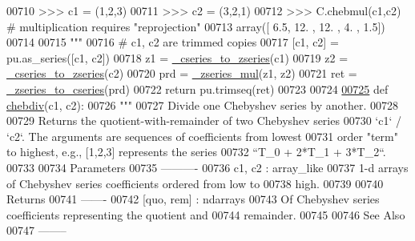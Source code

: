 \begin{DoxyCode}
00710 \textcolor{stringliteral}{    >>> c1 = (1,2,3)}
00711 \textcolor{stringliteral}{    >>> c2 = (3,2,1)}
00712 \textcolor{stringliteral}{    >>> C.chebmul(c1,c2) # multiplication requires "reprojection"}
00713 \textcolor{stringliteral}{    array([  6.5,  12. ,  12. ,   4. ,   1.5])}
00714 \textcolor{stringliteral}{}
00715 \textcolor{stringliteral}{    """}
00716     \textcolor{comment}{# c1, c2 are trimmed copies}
00717     [c1, c2] = pu.as\_series([c1, c2])
00718     z1 = \hyperlink{namespacepyneb_1_1utils_1_1chebyshev_a659e346f7cdd9fd058850b26f7e95b17}{\_cseries\_to\_zseries}(c1)
00719     z2 = \hyperlink{namespacepyneb_1_1utils_1_1chebyshev_a659e346f7cdd9fd058850b26f7e95b17}{\_cseries\_to\_zseries}(c2)
00720     prd = \hyperlink{namespacepyneb_1_1utils_1_1chebyshev_a46d958933482afac66ea41d143155dae}{\_zseries\_mul}(z1, z2)
00721     ret = \hyperlink{namespacepyneb_1_1utils_1_1chebyshev_a2a88474ce0ea12fb26f82b7116752dc1}{\_zseries\_to\_cseries}(prd)
00722     \textcolor{keywordflow}{return} pu.trimseq(ret)
00723 
00724 
\hypertarget{chebyshev_8py_source_l00725}{}\hyperlink{namespacepyneb_1_1utils_1_1chebyshev_aa84df28815f29342a7cdce9b95470f02}{00725} \textcolor{keyword}{def }\hyperlink{namespacepyneb_1_1utils_1_1chebyshev_aa84df28815f29342a7cdce9b95470f02}{chebdiv}(c1, c2):
00726     \textcolor{stringliteral}{"""}
00727 \textcolor{stringliteral}{    Divide one Chebyshev series by another.}
00728 \textcolor{stringliteral}{}
00729 \textcolor{stringliteral}{    Returns the quotient-with-remainder of two Chebyshev series}
00730 \textcolor{stringliteral}{    `c1` / `c2`.  The arguments are sequences of coefficients from lowest}
00731 \textcolor{stringliteral}{    order "term" to highest, e.g., [1,2,3] represents the series}
00732 \textcolor{stringliteral}{    ``T\_0 + 2*T\_1 + 3*T\_2``.}
00733 \textcolor{stringliteral}{}
00734 \textcolor{stringliteral}{    Parameters}
00735 \textcolor{stringliteral}{    ----------}
00736 \textcolor{stringliteral}{    c1, c2 : array\_like}
00737 \textcolor{stringliteral}{        1-d arrays of Chebyshev series coefficients ordered from low to}
00738 \textcolor{stringliteral}{        high.}
00739 \textcolor{stringliteral}{}
00740 \textcolor{stringliteral}{    Returns}
00741 \textcolor{stringliteral}{    -------}
00742 \textcolor{stringliteral}{    [quo, rem] : ndarrays}
00743 \textcolor{stringliteral}{        Of Chebyshev series coefficients representing the quotient and}
00744 \textcolor{stringliteral}{        remainder.}
00745 \textcolor{stringliteral}{}
00746 \textcolor{stringliteral}{    See Also}
00747 \textcolor{stringliteral}{    --------}

\end{DoxyCode}
